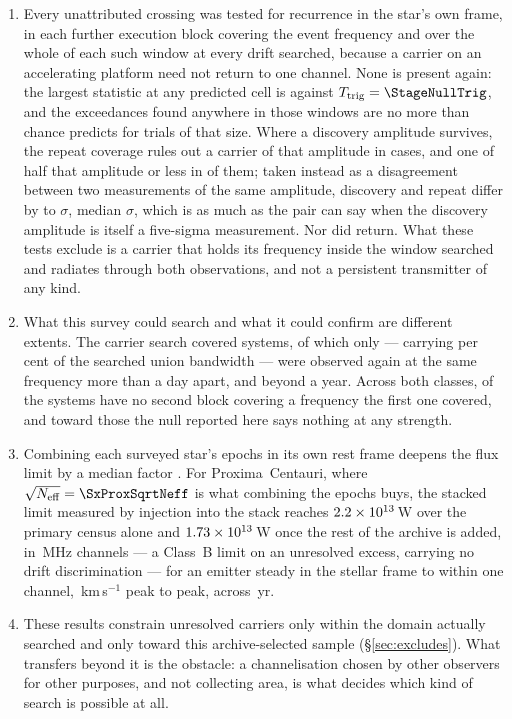 \begin{enumerate}[leftmargin=1.6em,itemsep=4pt,topsep=4pt,parsep=0pt]
\item Every unattributed crossing was tested for recurrence in the star's
own frame, in each further execution block covering the event frequency and
over the whole of each such window at every drift searched, because a
carrier on an accelerating platform need not return to one channel. None is
present again: the largest statistic at any predicted cell is \RcTMax{}
against $T_{\rm trig}=\StageNullTrig$, and the exceedances found anywhere in
those windows are no more than chance predicts for trials of that size.
Where a discovery amplitude survives, the repeat coverage rules out a
carrier of that amplitude in \RcNExcl{} cases, and one of half that
amplitude or less in \RcNFracHalf{} of them; taken instead as a
disagreement between two measurements of the same amplitude, discovery and
repeat differ by \RcExclMin{} to \RcExclMax$\sigma$, median
\RcExclMed$\sigma$, which is as much as the pair can say when the discovery
amplitude is itself a five-sigma measurement. Nor did \PrRankClause{}
return. What these tests exclude is a carrier that holds its frequency
inside the window searched and radiates through both observations, and not a
persistent transmitter of any kind.

\item What this survey could search and what it could confirm are different
extents. The carrier search covered
\RcSearchSys{} systems, of which only \RcConfSysDay{} --- carrying
\CvConfPctDay{} per cent of the searched union bandwidth --- were observed
again at the same frequency more than a day apart, and \RcConfSysYr{} beyond
a year. Across both classes, \RcNoRepSysAll{} of the \RcSearchSysAll{}
systems have no second block covering a frequency the first one covered, and
toward those the null reported here says nothing at any strength.

\item Combining each surveyed star's epochs in its own rest frame deepens
the flux limit by a median factor \SyStkGainMed. For Proxima~Centauri,
where $\sqrt{N_{\rm eff}}=\SxProxSqrtNeff$ is what combining the epochs
buys, the stacked limit measured by injection into the stack reaches
$2.2\times10^{13}$\,W over the primary census alone and
$1.73\times10^{13}$\,W once the rest of the archive is added, in
\ChanBModeMHz\,MHz channels --- a Class~B limit on an unresolved excess,
carrying no drift discrimination --- for an emitter steady in the stellar
frame to within one channel, \StkProxTolKms\,km\,s$^{-1}$ peak to peak,
across \StkProxSpanYr\,yr.

\item These results constrain unresolved carriers only within the domain
actually searched and only toward this archive-selected sample
(\S\ref{sec:excludes}). What transfers beyond it is the obstacle: a
channelisation chosen by other observers for other purposes, and not
collecting area, is what decides which kind of search is possible at all.

\end{enumerate}
